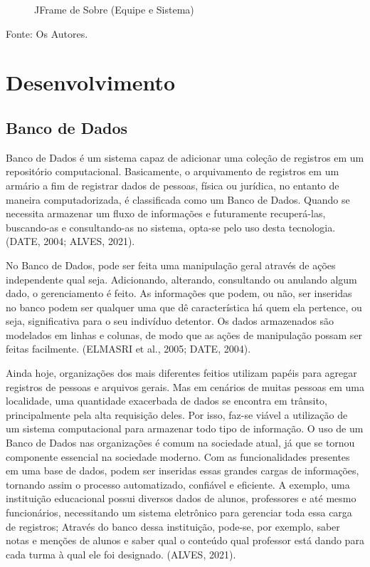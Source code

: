 \documentclass[a4paper,12pt]{article}
\begin{document}
\begin{itemize}
\begin{figure}[H]
		\caption{JFrame de Sobre (Equipe e Sistema)}
	\end{figure}
	\noindent Fonte: Os Autores.
\end{itemize}


\pagebreak
\section{Desenvolvimento}


\subsection{Banco de Dados}
Banco de Dados é um sistema capaz de adicionar uma coleção de registros em um repositório computacional. Basicamente, o arquivamento de 
registros em um armário a fim de registrar dados de pessoas, física ou jurídica, no entanto de maneira computadorizada, é classificada 
como um Banco de Dados. Quando se necessita armazenar um fluxo de informações e futuramente recuperá-las, buscando-as e consultando-as 
no sistema, opta-se pelo uso desta tecnologia. (DATE, 2004; ALVES, 2021).

No Banco de Dados, pode ser feita uma manipulação geral através de ações independente qual seja. Adicionando, alterando, consultando 
ou anulando algum dado, o gerenciamento é feito. As informações que podem, ou não, ser inseridas no banco podem ser qualquer uma que 
dê característica há quem ela pertence, ou seja, significativa para o seu indivíduo detentor. Os dados armazenados são modelados em 
linhas e colunas, de modo que as ações de manipulação possam ser feitas facilmente. (ELMASRI et al., 2005; DATE, 2004).

Ainda hoje, organizações dos mais diferentes feitios utilizam papéis para agregar registros de pessoas e arquivos gerais. Mas em cenários
de muitas pessoas em uma localidade, uma quantidade exacerbada de dados se encontra em trânsito, principalmente pela alta requisição deles. 
Por isso, faz-se viável a utilização de um sistema computacional para armazenar todo tipo de informação. O uso de um Banco de Dados nas 
organizações é comum na sociedade atual, já que se tornou componente essencial na sociedade moderno. Com as funcionalidades presentes em 
uma base de dados, podem ser inseridas essas grandes cargas de informações, tornando assim o processo automatizado, confiável e eficiente. 
A exemplo, uma instituição educacional possui diversos dados de alunos, professores e até mesmo funcionários, necessitando um sistema 
eletrônico para gerenciar toda essa carga de registros; Através do banco dessa instituição, pode-se, por exemplo, saber notas e menções 
de alunos e saber qual o conteúdo qual professor está dando para cada turma à qual ele foi designado. (ALVES, 2021).
\end{document}
